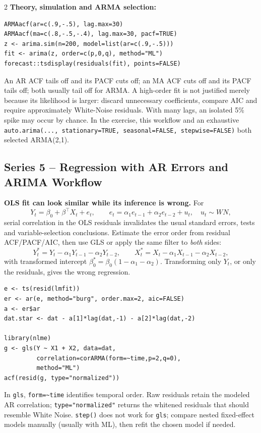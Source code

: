 \documentclass[9pt,a4paper]{extarticle}
\newcommand{\key}[1]{\textbf{#1}}
\begin{document}
\begin{multicols}{2}
\key{Theory, simulation and ARMA selection:}
{\scriptsize
\begin{verbatim}
ARMAacf(ar=c(.9,-.5), lag.max=30)
ARMAacf(ma=c(.8,-.5,-.4), lag.max=30, pacf=TRUE)
z <- arima.sim(n=200, model=list(ar=c(.9,-.5)))
fit <- arima(z, order=c(p,0,q), method="ML")
forecast::tsdisplay(residuals(fit), points=FALSE)
\end{verbatim}}
An AR ACF tails off and its PACF cuts off; an MA ACF cuts off and its PACF tails off; both usually tail off for ARMA. A high-order fit is not justified merely because its likelihood is larger: discard unnecessary coefficients, compare AIC and require approximately White-Noise residuals. With many lags, an isolated 5\% spike may occur by chance. In the exercise, this workflow and an exhaustive \texttt{auto.arima(..., stationary=TRUE, seasonal=FALSE, stepwise=FALSE)} both selected ARMA(2,1).

\subsection*{Series 5 -- Regression with AR Errors and ARIMA Workflow}

\key{OLS fit can look similar while its inference is wrong.} For
\[
Y_t=\beta_0+\beta^\top X_t+e_t,\qquad
e_t=\alpha_1e_{t-1}+\alpha_2e_{t-2}+u_t,\quad u_t\sim WN,
\]
serial correlation in the OLS residuals invalidates the usual standard errors, tests and variable-selection conclusions. Estimate the error order from residual ACF/PACF/AIC, then use GLS or apply the same filter to \emph{both} sides:
\[
Y_t^*=Y_t-\alpha_1Y_{t-1}-\alpha_2Y_{t-2},\qquad
X_t^*=X_t-\alpha_1X_{t-1}-\alpha_2X_{t-2},
\]
with transformed intercept \(\beta_0^*=\beta_0(1-\alpha_1-\alpha_2)\). Transforming only \(Y_t\), or only the residuals, gives the wrong regression.

{\scriptsize
\begin{verbatim}
e <- ts(resid(lmfit))
er <- ar(e, method="burg", order.max=2, aic=FALSE)
a <- er$ar
dat.star <- dat - a[1]*lag(dat,-1) - a[2]*lag(dat,-2)

library(nlme)
g <- gls(Y ~ X1 + X2, data=dat,
         correlation=corARMA(form=~time,p=2,q=0),
         method="ML")
acf(resid(g, type="normalized"))
\end{verbatim}}
In \texttt{gls}, \texttt{form=\textasciitilde time} identifies temporal order. Raw residuals retain the modeled AR correlation; \texttt{type="normalized"} returns the whitened residuals that should resemble White Noise. \texttt{step()} does not work for \texttt{gls}; compare nested fixed-effect models manually (usually with ML), then refit the chosen model if needed.


\end{multicols}
\end{document}
